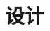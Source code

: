\documentclass[zihao=-4,a4,seagreen,openany]{ibook}
\begin{document}
\frontmatter
\tableofcontents

\mainmatter
\part{设计}


% 

% 

\backmatter
\lstlistoflistings
\listoffigures
\printindex
\end{document}
